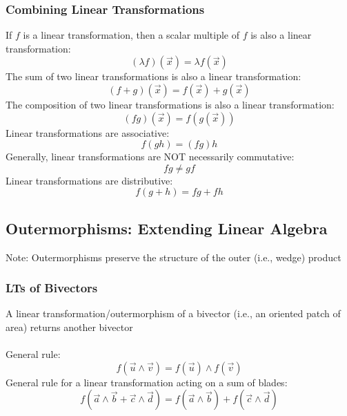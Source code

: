 \documentclass[a4paper]{article}
\begin{document}
\subsubsection*{Combining Linear Transformations}
If $f$ is a linear transformation, then a scalar multiple of $f$ is also a linear transformation:
    \begin{equation}
        (\lambda f)(\vec{x}) = \lambda f(\vec{x})
    \end{equation}
The sum of two linear transformations is also a linear transformation:
    \begin{equation}
        (f+g)(\vec{x}) = f(\vec{x}) + g(\vec{x})
    \end{equation}
The composition of two linear transformations is also a linear transformation:
    \begin{equation}
        (fg)(\vec{x}) = f(g(\vec{x}))
    \end{equation}
Linear transformations are associative:
    \begin{equation}
        f(gh) = (fg)h
    \end{equation}
Generally, linear transformations are NOT necessarily commutative:
    \begin{equation}
        fg \neq gf
    \end{equation}
Linear transformations are distributive:
    \begin{equation}
        f(g+h) = fg + fh
    \end{equation}
\subsection*{Outermorphisms: Extending Linear Algebra}
Note: Outermorphisms preserve the structure of the outer (i.e., wedge) product 
\subsubsection*{LTs of Bivectors}
A linear transformation/outermorphism of a bivector (i.e., an oriented patch of area) returns another bivector
\\
\\
General rule:
    \begin{equation}
        f(\vec{u}\wedge \vec{v}) = f(\vec{u}) \wedge f(\vec{v})
    \end{equation}
General rule for a linear transformation acting on a sum of blades:
    \begin{equation}
        f(\vec{a} \wedge \vec{b} + \vec{c} \wedge \vec{d}) = f(\vec{a} \wedge \vec{b}) + f(\vec{c} \wedge \vec{d})
    \end{equation}
\end{document}
